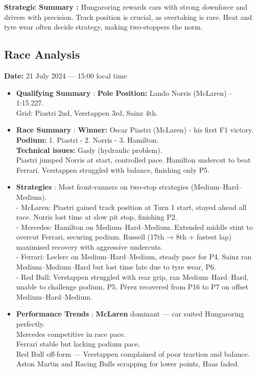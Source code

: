 \textbf{Strategic Summary :}
Hungaroring rewards cars with strong downforce and drivers with precision. Track position is crucial, as overtaking is rare. Heat and tyre wear often decide strategy, making two-stoppers the norm.


\subsection{Race Analysis}

\textbf{Date:} 21 July 2024 — 15:00 local time 

\begin{itemize}
    \item \textbf{Qualifying Summary} : \textbf{Pole Position:} Lando Norris (McLaren) – 1:15.227. \\
    Grid: Piastri 2nd, Verstappen 3rd, Sainz 4th.
    
    \item \textbf{Race Summary} : \textbf{Winner:} Oscar Piastri (McLaren) - his first F1 victory.\\
    \textbf{Podium:} 1. Piastri - 2. Norris - 3. Hamilton.\\
    \textbf{Technical issues:} Gasly (hydraulic problem).\\
    Piastri jumped Norris at start, controlled pace. Hamilton undercut to beat Ferrari. Verstappen struggled with balance, finishing only P5.
    
    \item \textbf{Strategies} : Most front-runners on two-stop strategies (Medium–Hard–Medium). \\
    - McLaren: Piastri gained track position at Turn 1 start, stayed ahead all race. Norris lost time at slow pit stop, finishing P2. \\ 
    - Mercedes: Hamilton on Medium–Hard–Medium. Extended middle stint to overcut Ferrari, securing podium. Russell (17th → 8th + fastest lap) maximised recovery with aggressive undercuts. \\
    - Ferrari: Leclerc on Medium–Hard–Medium, steady pace for P4. Sainz ran Medium–Medium–Hard but lost time late due to tyre wear, P6. \\
    - Red Bull: Verstappen struggled with rear grip, ran Medium–Hard–Hard, unable to challenge podium, P5. Pérez recovered from P16 to P7 on offset Medium–Hard–Medium.
    
    \item \textbf{Performance Trends} : \textbf{McLaren} dominant — car suited Hungaroring perfectly. \\
    Mercedes competitive in race pace. \\
    Ferrari stable but lacking podium pace. \\
    Red Bull off-form — Verstappen complained of poor traction and balance. \\
    Aston Martin and Racing Bulls scrapping for lower points, Haas faded.
    

\end{itemize}

